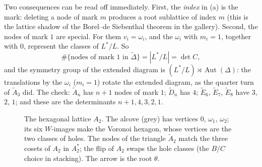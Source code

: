 \documentclass[11pt,openany]{book}
\theoremstyle{plain}
\theoremstyle{definition}
\theoremstyle{remark}
\newcommand{\abs}[1]{\left\lvert #1 \right\rvert}
\begin{document}
Two consequences can be read off immediately. First, the \emph{index} in (a) is the mark: deleting a node
of mark $m$ produces a root sublattice of index $m$ (this is the lattice shadow of the Borel--de Siebenthal
theorem in the gallery). Second, the nodes of mark $1$ are special. For them $v_i=\omega_i$, and the
$\omega_i$ with $m_i=1$, together with $0$, represent the classes of $L^*/L$. So
\[
  \#\{\text{nodes of mark }1\text{ in }\tilde\Delta\}=\abs{L^*/L}=\det C,
\]
and the symmetry group of the extended diagram is $(L^*/L)\rtimes\operatorname{Aut}(\Delta)$: the
translations by the $\omega_i$ ($m_i=1$) rotate the extended diagram, as the quarter turn of $\tilde A_3$ did.
The check: $\tilde A_n$ has $n+1$ nodes of mark $1$; $\tilde D_n$ has $4$; $\tilde E_6$, $\tilde E_7$,
$\tilde E_8$ have $3$, $2$, $1$; and these are the determinants $n+1,4,3,2,1$.

\begin{figure}[ht]
\centering
{}
\caption{The hexagonal lattice $A_2$. The alcove (grey) has vertices $0$, $\omega_1$, $\omega_2$; its six
$W$-images make the Voronoi hexagon, whose vertices are the two classes of holes. The nodes of the
triangle $\tilde A_2$ match the three cosets of $A_2$ in $A_2^*$; the flip of $A_2$ swaps the hole
classes (the $B$/$C$ choice in stacking). The arrow is the root $\theta$.}
\label{DYN:fig:hex}
\end{figure}
\end{document}
